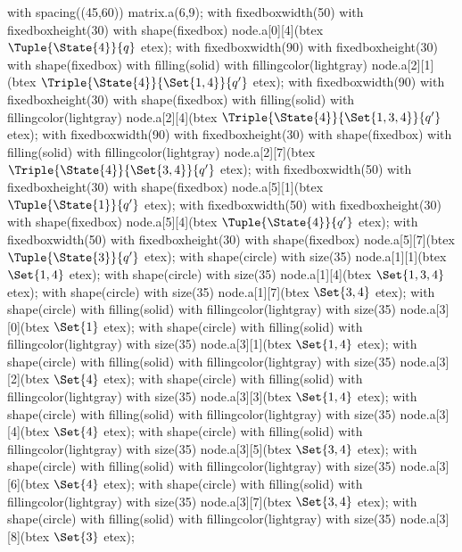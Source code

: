    with spacing((45,60)) matrix.a(6,9);
    with fixedboxwidth(50) with fixedboxheight(30) with shape(fixedbox) node.a[0][4](btex $\Tuple{\State{4}}{q}$ etex);
    with fixedboxwidth(90) with fixedboxheight(30) with shape(fixedbox) with filling(solid) with fillingcolor(lightgray) node.a[2][1](btex $\Triple{\State{4}}{\Set{1, 4}}{q'}$ etex);
    with fixedboxwidth(90) with fixedboxheight(30) with shape(fixedbox) with filling(solid) with fillingcolor(lightgray) node.a[2][4](btex $\Triple{\State{4}}{\Set{1, 3, 4}}{q'}$ etex);
    with fixedboxwidth(90) with fixedboxheight(30) with shape(fixedbox) with filling(solid) with fillingcolor(lightgray) node.a[2][7](btex $\Triple{\State{4}}{\Set{3, 4}}{q'}$ etex);
    with fixedboxwidth(50) with fixedboxheight(30) with shape(fixedbox) node.a[5][1](btex $\Tuple{\State{1}}{q'}$ etex);
    with fixedboxwidth(50) with fixedboxheight(30) with shape(fixedbox) node.a[5][4](btex $\Tuple{\State{4}}{q'}$ etex);
    with fixedboxwidth(50) with fixedboxheight(30) with shape(fixedbox) node.a[5][7](btex $\Tuple{\State{3}}{q'}$ etex);
    with shape(circle) with size(35) node.a[1][1](btex \ssd $\Set{1, 4}$ etex);
    with shape(circle) with size(35) node.a[1][4](btex \ssd $\Set{1, 3, 4}$ etex);
    with shape(circle) with size(35) node.a[1][7](btex \ssd $\Set{3, 4}$ etex);
    with shape(circle) with filling(solid) with fillingcolor(lightgray) with size(35) node.a[3][0](btex \ssd $\Set{1}$ etex);
    with shape(circle) with filling(solid) with fillingcolor(lightgray) with size(35) node.a[3][1](btex \ssd $\Set{1, 4}$ etex);
    with shape(circle) with filling(solid) with fillingcolor(lightgray) with size(35) node.a[3][2](btex \ssd $\Set{4}$ etex);
    with shape(circle) with filling(solid) with fillingcolor(lightgray) with size(35) node.a[3][3](btex \ssd $\Set{1, 4}$ etex);
    with shape(circle) with filling(solid) with fillingcolor(lightgray) with size(35) node.a[3][4](btex \ssd $\Set{4}$ etex);
    with shape(circle) with filling(solid) with fillingcolor(lightgray) with size(35) node.a[3][5](btex \ssd $\Set{3, 4}$ etex);
    with shape(circle) with filling(solid) with fillingcolor(lightgray) with size(35) node.a[3][6](btex \ssd $\Set{4}$ etex);
    with shape(circle) with filling(solid) with fillingcolor(lightgray) with size(35) node.a[3][7](btex \ssd $\Set{3, 4}$ etex);
    with shape(circle) with filling(solid) with fillingcolor(lightgray) with size(35) node.a[3][8](btex \ssd $\Set{3}$ etex);
